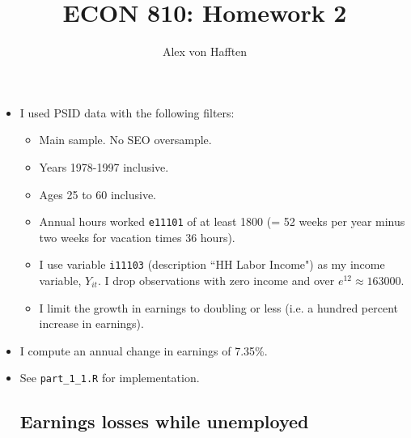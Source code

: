 \documentclass{article}
\title{ECON 810: Homework 2}
\author{Alex von Hafften }
\begin{document}
\maketitle

\begin{itemize}

\section{Part 1: Data}

\subsection{Earnings gains while employed}

\item I used PSID data with the following filters:

\begin{itemize}

\item Main sample. No SEO oversample.

\item Years 1978-1997 inclusive.

\item Ages 25 to 60 inclusive.

\item Annual hours worked \texttt{e11101} of at least 1800 (= 52 weeks per year minus two weeks for vacation times 36 hours).

\item I use variable \texttt{i11103} (description ``HH Labor Income") as my income variable, $Y_{it}$. I drop observations with zero income and over $e^{12} \approx 163000$.

\item I limit the growth in earnings to doubling or less (i.e. a hundred percent increase in earnings).

\end{itemize} 

\item I compute an annual change in earnings of 7.35\%.

\item See \texttt{part\_1\_1.R} for implementation.

\subsection{Earnings losses while unemployed}


\end{itemize}
\end{document}
